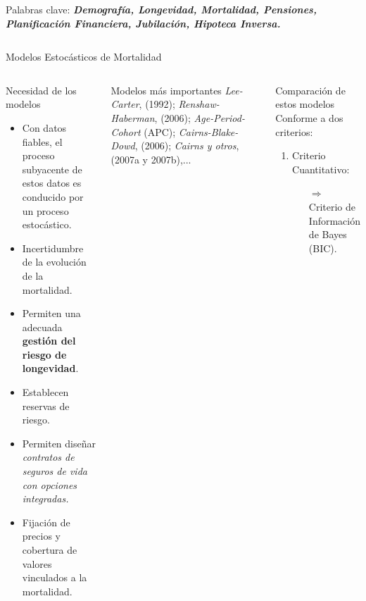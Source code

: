 \documentclass[]{beamer}
\begin{document}
\begin{frame}{\vspace{1ex}\hfill Palabras clave: \bfseries \textit{Demograf\'ia, Longevidad, Mortalidad, Pensiones, Planificaci\'on Financiera, Jubilaci\'on, Hipoteca Inversa.}}
\begin{columns}[t]
\begin{block}{Modelos Estoc\'asticos de Mortalidad}
			\begin{columns}[t]
				\begin{block}{Necesidad de los modelos}
					\begin{itemize}
						\item Con datos fiables, el proceso subyacente de estos datos es conducido por un proceso estoc\'astico.
						\item Incertidumbre de la evoluci\'on de la mortalidad.
						\item Permiten una adecuada \textbf{gesti\'on del riesgo de longevidad}.
						\item Establecen reservas de riesgo.
						\item Permiten dise\~nar \textit{contratos de seguros de vida con opciones integradas.}
						\item Fijaci\'on de precios y cobertura de valores vinculados a la mortalidad.													%
					\end{itemize}
				\end{block}
				\begin{block}{Modelos m\'as importantes}
				\vspace{-0.4cm}
				\textit{Lee-Carter}, (1992); \textit{Renshaw-Haberman}, (2006); \textit{Age-Period-Cohort} (APC); \textit{Cairns-Blake-Dowd}, (2006); \textit{Cairns y otros}, (2007a y 2007b),...
				\end{block}\vspace{-1cm}
				\begin{block}{Comparaci\'on de estos modelos}
				\setlength{\parindent}{1.2em}
				\setlength{\parskip}{1ex}\vspace{-1cm}
					\noindent Conforme a dos criterios:\vspace{-0.3cm} 
					\begin{enumerate}
						\item Criterio Cuantitativo:
						\begin{enumerate}
							\item[$\Rightarrow$] Criterio de Informaci\'on de Bayes (BIC).

\end{enumerate}
\end{enumerate}
\end{block}
\end{columns}
\end{block}
\end{columns}
\end{frame}
\end{document}
